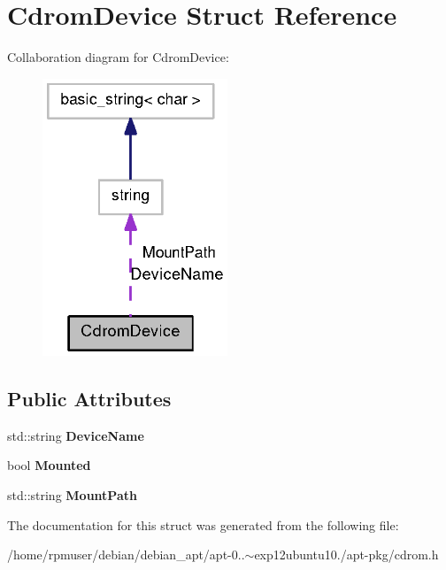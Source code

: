 \section{\-Cdrom\-Device \-Struct \-Reference}
\label{structCdromDevice}


\-Collaboration diagram for \-Cdrom\-Device\-:
\nopagebreak
\begin{figure}[H]
\begin{center}
\leavevmode
\includegraphics[width=157pt]{structCdromDevice__coll__graph}
\end{center}
\end{figure}
\subsection*{\-Public \-Attributes}
\begin{DoxyCompactItemize}
\item 
std\-::string {\bfseries \-Device\-Name}\label{structCdromDevice_ae15a832f17b0d08eb1a58da806f687c8}

\item 
bool {\bfseries \-Mounted}\label{structCdromDevice_ad495551c94eea7c545f2c2f476d47372}

\item 
std\-::string {\bfseries \-Mount\-Path}\label{structCdromDevice_ab9088f7c9e99cfc782a0fcb9388f583d}

\end{DoxyCompactItemize}


\-The documentation for this struct was generated from the following file\-:\begin{DoxyCompactItemize}
\item 
/home/rpmuser/debian/debian\-\_\-apt/apt-\/0..$\sim$exp12ubuntu10./apt-\/pkg/cdrom.\-h\end{DoxyCompactItemize}
